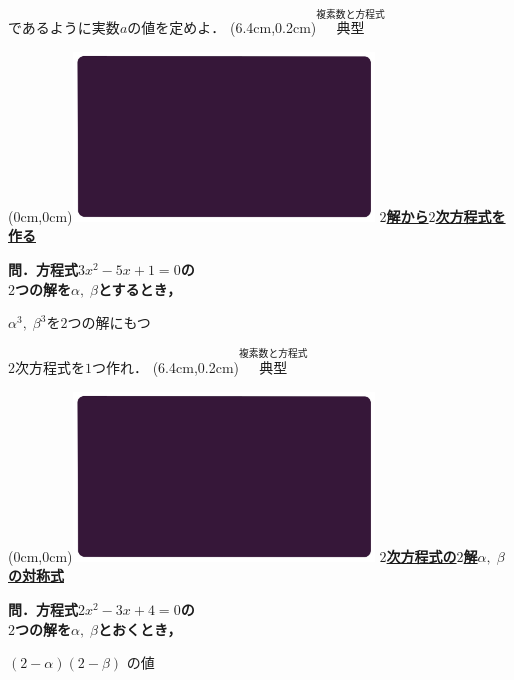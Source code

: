 \documentclass[10pt,
fleqn,
dvipdfmx,
uplatex
]{jsarticle}
\begin{document}
\large 
\hfill 
であるように実数$a$の値を定めよ．
\at(6.4cm,0.2cm){\small\color{bradorange}$\overset{\text{複素数と方程式}}{\text{典型}}$}


\newpage



\at(0cm,0cm){\includegraphics[width=8cm,bb=0 0 1920 1080]{./media_local/smart_background/複素数と方程式.jpeg}}
{\color{orange}\bf\boldmath\Large\underline{$2$解から$2$次方程式を作る}}\vspace{0.3zw}

\Large 
\bf\boldmath 問．方程式$3x^2-5x+1=0$の\\
$2$つの解を$\alpha ,\;\beta$とするとき，

\LARGE
\hspace{0.7zw}$\alpha ^3,\;\beta ^3$を$2$つの解にもつ

\Large
\hfill $2$次方程式を$1$つ作れ．
\at(6.4cm,0.2cm){\small\color{bradorange}$\overset{\text{複素数と方程式}}{\text{典型}}$}


\newpage



\at(0cm,0cm){\includegraphics[width=8cm,bb=0 0 1920 1080]{./media_local/smart_background/複素数と方程式.jpeg}}
{\color{orange}\bf\boldmath\large\underline{$2$次方程式の$2$解$\alpha ,\;\beta$の対称式}}\vspace{0.3zw}

\Large 
\bf\boldmath 問．方程式$2x^2-3x+4=0$の\\
$2$つの解を$\alpha ,\;\beta$とおくとき，

\huge
\hspace{0.2zw}$\left(2-\alpha \right)\left(2-\beta \right)$
の値
\end{document}
